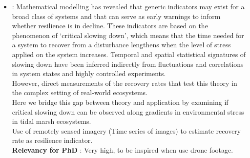 \documentclass[]{report}
\begin{document}
\begin{itemize}
		\item \cite{van2017vegetation} : 
		Mathematical modelling has revealed that generic indicators may exist for a broad class of systems and	that can serve as early warnings to inform whether resilience is in decline. These indicators are based on the phenomenon of ‘critical slowing down’, which means that the time needed for a system to recover from a disturbance lengthens when the level of stress applied on the system increases. Temporal and spatial statistical signatures of slowing down have been inferred indirectly from fluctuations and correlations in system states and highly controlled experiments.
		\\However, direct measurements of the recovery rates that test this theory in the complex setting of real-world ecosystems.
		\\ Here we bridge this gap between theory and application by examining if critical slowing down can be observed along gradients in environmental stress in tidal marsh ecosystems.
		\\ Use of remotely sensed imagery (Time series of images) to estimate recovery rate as resilience indicator.
		\\\textbf{Relevancy for PhD} : Very high, to be inspired when use drone footage.
		

\end{itemize}
\end{document}
